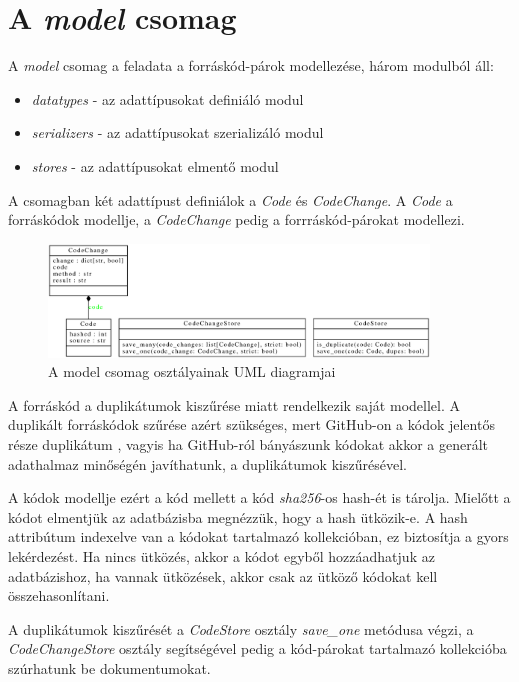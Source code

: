 \section{A \emph{model} csomag}

A \emph{model} csomag a feladata a forráskód-párok modellezése, három modulból áll:

\begin{itemize}
	\item \emph{datatypes} - az adattípusokat definiáló modul
	\item \emph{serializers} - az adattípusokat szerializáló modul
	\item \emph{stores} - az adattípusokat elmentő modul
\end{itemize}

A csomagban két adattípust definiálok a \emph{Code} és \emph{CodeChange}.
A \emph{Code} a forráskódok modellje, a \emph{CodeChange} pedig a forrráskód-párokat modellezi.

\begin{figure}[H]
	\centering
	\includegraphics[width=0.9\textwidth]{images/uml/modells.eps}
	\caption{A model csomag osztályainak UML diagramjai}
\end{figure}

A forráskód a duplikátumok kiszűrése miatt rendelkezik saját modellel.
A duplikált forráskódok szűrése azért szükséges, mert GitHub-on a kódok jelentős része duplikátum
\cite{gitubDuplication},
vagyis ha GitHub-ról bányászunk kódokat akkor a generált adathalmaz minőségén javíthatunk,
a duplikátumok kiszűrésével.

A kódok modellje ezért a kód mellett a kód \emph{sha256}-os hash-ét is tárolja.
Mielőtt a kódot elmentjük az adatbázisba megnézzük, hogy a hash ütközik-e.
A hash attribútum indexelve van a kódokat tartalmazó kollekcióban, ez biztosítja a gyors lekérdezést.
Ha nincs ütközés, akkor a kódot egyből hozzáadhatjuk az adatbázishoz,
ha vannak ütközések, akkor csak az ütköző kódokat kell összehasonlítani.

A duplikátumok kiszűrését a \emph{CodeStore} osztály \emph{save\_one} metódusa végzi,
a \emph{CodeChangeStore} osztály segítségével pedig a kód-párokat tartalmazó kollekcióba
szúrhatunk be dokumentumokat.

